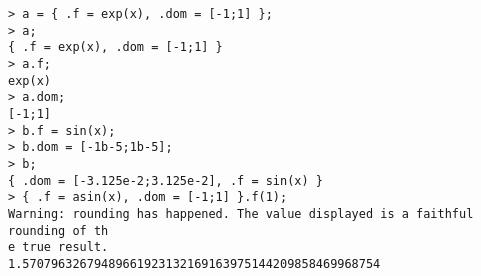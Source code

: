 \begin{center}\begin{minipage}{15cm}\begin{Verbatim}[frame=single]
> a = { .f = exp(x), .dom = [-1;1] };
> a;
{ .f = exp(x), .dom = [-1;1] }
> a.f;
exp(x)
> a.dom;
[-1;1]
> b.f = sin(x);
> b.dom = [-1b-5;1b-5];
> b;
{ .dom = [-3.125e-2;3.125e-2], .f = sin(x) }
> { .f = asin(x), .dom = [-1;1] }.f(1);
Warning: rounding has happened. The value displayed is a faithful rounding of th
e true result.
1.57079632679489661923132169163975144209858469968754
\end{Verbatim}
\end{minipage}\end{center}
